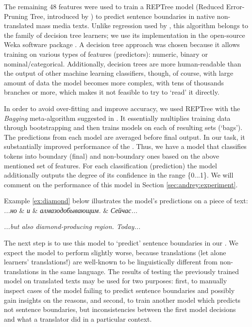 \documentclass[output=paper]{langsci/langscibook.cls}
\begin{document}
The remaining 48 features were used to train a REPTree model (Reduced Error-Pruning Tree, introduced by \citealt{Quinlan:1987})  to predict sentence boundaries in native non-translated mass media texts. Unlike regression used by \citet{Gries:2014}, this algorithm belongs to the family of decision tree learners; we use its implementation in the open-source Weka software package \citet{Hall:2009}. A decision tree approach was chosen because it allows training on various types of features (predictors): numeric, binary or nominal/categorical. Additionally, decision trees are more human-readable than the output of other machine learning classifiers, though, of course, with large amount of data the model becomes more complex, with tens of thousands branches or more, which makes it not feasible to try to `read' it directly. 

In order to avoid over-fitting and improve accuracy, we used REPTree with the \textit{Bagging} meta-algorithm suggested in \citet{Breiman:1996}. It essentially multiplies training data through bootstrapping and then trains models on each of resulting sets (`bags'). The predictions from each model are averaged before final output. In our task, it substantially improved performance of the . Thus, we have a model that classifies tokens into boundary (final) and non-boundary ones based on the above mentioned set of features. For each classification (prediction) the model additionally outputs the degree of its confidence in the range \{0...1\}.  We will comment on the performance of this model in Section \ref{sec:andrey:experiment}.

Example \ref{ex:diamond} below illustrates the model's predictions on a piece of  text: \\

\ea
\label{ex:diamond}
    \textit{...но} \&  \textit{и} \&  \textit{алмазодобывающим.} \& \textit{Сейчас...}

\textit{...but also diamond-producing region. Today...}
\z

The next step is to use this model to `predict' sentence boundaries in our . We expect the model to perform slightly worse, because translations (let alone learners' translations!) are well-known to be linguistically different from non-translations in the same language. The results of testing the previously trained model on translated texts may be used for two purposes: first, to manually inspect cases of the model failing to predict sentence boundaries and possibly gain insights on the reasons, and second, to train another model which predicts not sentence boundaries, but inconsistencies between the first model decisions and what a translator did in a particular context. 
\end{document}
